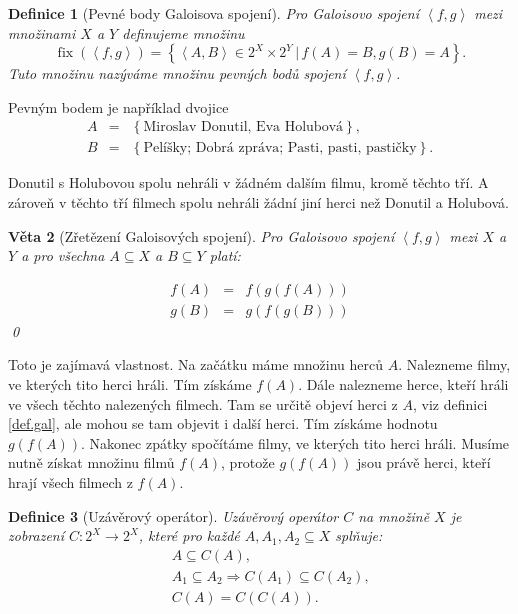 \documentclass[12pt]{article}
\newcommand{\sep}{\,|\,}
\newcommand{\adds}[1]{\left\{#1\right\}}
\newcommand{\addsp}[1]{\left<#1\right>}
\renewcommand{\implies}{\Rightarrow}
\DeclareMathOperator{\fix}{fix}
\newtheorem{mydef}{Definice}
\newtheorem{theorem}[mydef]{Věta}
\begin{document}
\begin{mydef}[Pevné body Galoisova spojení]
Pro Galoisovo spojení $\addsp{f, g}$ mezi množinami $X$ a $Y$ definujeme množinu
$$
\fix(\addsp{f,g})=\adds{\addsp{A,B}\in 2^X\times2^Y\sep f(A)=B, g(B)=A}.
$$
Tuto množinu nazýváme množinu pevných bodů spojení $\addsp{f,g}$. 
\end{mydef}

Pevným bodem je například dvojice 
\begin{eqnarray*}
A&=&\adds{\mbox{Miroslav Donutil, Eva Holubová}},\\
B&=& \adds{\mbox{Pelíšky; Dobrá zpráva; Pasti, pasti, pastičky}}.
\end{eqnarray*}

Donutil s Holubovou spolu nehráli v žádném dalším filmu, kromě těchto tří. A zároveň v těchto tří filmech spolu nehráli žádní jiní herci než Donutil a Holubová. 

\begin{theorem}[Zřetězení Galoisových spojení]\label{th.chain}
Pro Galoisovo spojení $\addsp{f,g}$ mezi $X$ a $Y$ a pro všechna $A\subseteq X$ a $B\subseteq Y$ platí:

\begin{eqnarray}
f(A)&=&f(g(f(A)))\\
g(B)&=&g(f(g(B)))
\end{eqnarray}
\qed\end{theorem}

Toto je zajímavá vlastnost. Na začátku máme množinu herců $A$. Nalezneme filmy, ve kterých tito herci hráli. Tím získáme $f(A)$. Dále nalezneme herce, kteří hráli ve všech těchto nalezených filmech. Tam se určitě objeví herci z $A$, viz definici \ref{def.gal}, ale mohou se tam objevit i další herci. Tím získáme hodnotu $g(f(A))$. Nakonec zpátky spočítáme filmy, ve kterých tito herci hráli. Musíme nutně získat množinu filmů $f(A)$, protože $g(f(A))$ jsou právě herci, kteří hrají všech filmech z $f(A)$.

\begin{mydef}[Uzávěrový operátor]\label{def.clop}
Uzávěrový operátor $C$ na množině $X$ je zobrazení $C: 2^X\rightarrow2^X$, které pro každé $A, A_1, A_2\subseteq X$ splňuje:
\begin{eqnarray}
&&A\subseteq C(A),\\
&&A_1\subseteq A_2\implies C(A_1) \subseteq C(A_2),\\
&&C(A) = C(C(A)).
\end{eqnarray}
\end{mydef}
\end{document}
